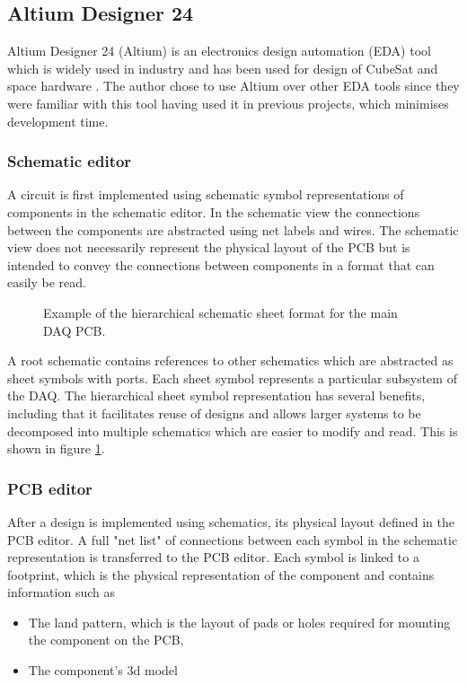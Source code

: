 \documentclass{report}
\begin{document}
\subsection{Altium Designer 24}

Altium Designer 24 (Altium) is an electronics design automation (EDA) tool which is widely used in industry and has been used for design of CubeSat and space hardware \cite{10061409}.
The author chose to use Altium over other EDA tools since they were familiar with this tool having used it in previous projects, which minimises development time.

\subsubsection{Schematic editor}
\label{sec:schematic-editor}
A circuit is first implemented using schematic symbol representations of components in the schematic editor. In the schematic view the connections between the components are abstracted using net labels and wires. The schematic view does not necessarily represent the physical layout of the PCB but is intended to convey the connections between components in a format that can easily be read.

\begin{figure}[H]
  \centering
  
  \caption{Example of the hierarchical schematic sheet format for the main DAQ PCB.}
  \label{fig:altium-schematic-hierarchical}
\end{figure}

A root schematic contains references to other schematics which are abstracted as sheet symbols with ports. Each sheet symbol represents a particular subsystem of the DAQ. The hierarchical sheet symbol representation has several benefits, including that it facilitates reuse of designs and allows larger systems to be decomposed into multiple schematics which are easier to modify and read. This is shown in figure \ref{fig:altium-schematic-hierarchical}.

\subsubsection{PCB editor}
\label{sec:pcb-editor}
After a design is implemented using schematics, its physical layout defined in the PCB editor.
A full "net list" of connections between each symbol in the schematic representation is transferred to the PCB editor. Each symbol is linked to a footprint, which is the physical representation of the component and contains information such as
\begin{itemize}
  \item The land pattern, which is the layout of pads or holes required for mounting the component on the PCB,
  \item The component's 3d model
\end{itemize}
\end{document}
